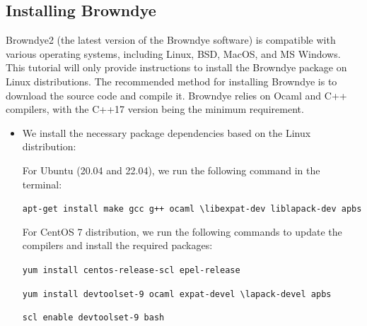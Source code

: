 \documentclass[9pt,training,pubversion]{livecoms}
\begin{document}
\subsection{Installing Browndye} \label{browndye_installations}
\vspace{2mm}

\noindent Browndye2 (the latest version of the Browndye software) is compatible with various operating systems, including Linux, BSD, MacOS, and MS Windows. This tutorial will only provide instructions to install the Browndye package on Linux distributions. The recommended method for installing Browndye is to download the source code and compile it. Browndye relies on Ocaml and C++ compilers, with the C++17 version being the minimum requirement.

\begin{itemize}
\item We install the necessary package dependencies based on the Linux distribution:

\noindent For Ubuntu (20.04 and 22.04), we run the following command in the terminal:

\begin{tcolorbox}[colback=black!8!white, colframe=black!50!black, fontlower=\tiny, left=2pt, right=2pt, top=2pt, bottom=2pt] 
\texttt{apt-get install make gcc g++ ocaml \textbackslash \linebreak libexpat-dev liblapack-dev apbs}
\end{tcolorbox}

\noindent  For CentOS 7 distribution, we run the following commands to update the compilers and install the required packages:

\begin{tcolorbox}[colback=black!8!white, colframe=black!50!black, fontlower=\tiny, left=2pt, right=2pt, top=2pt, bottom=2pt] 
\texttt{yum install centos-release-scl epel-release} 
\end{tcolorbox}

\begin{tcolorbox}[colback=black!8!white, colframe=black!50!black, fontlower=\tiny, left=2pt, right=2pt, top=2pt, bottom=2pt] 
\texttt{yum install devtoolset-9 ocaml expat-devel \textbackslash \linebreak lapack-devel apbs}
\end{tcolorbox}

\begin{tcolorbox}[colback=black!8!white, colframe=black!50!black, fontlower=\tiny, left=2pt, right=2pt, top=2pt, bottom=2pt] 
\texttt{scl enable devtoolset-9 bash} 
\end{tcolorbox}



\end{itemize}
\end{document}
